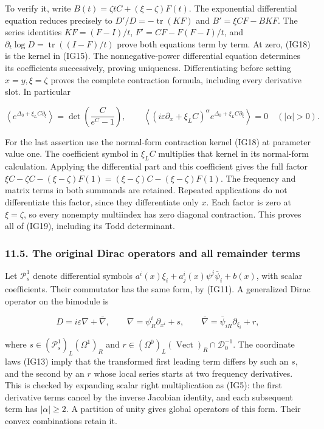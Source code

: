 \documentclass[
  11pt,
]{article}
\newcounter{none} %
\begin{document}
To verify it, write \(B(t)=\zeta tC+(\xi-\zeta)F(t)\). The exponential
differential equation reduces precisely to
\(D'/D=-\operatorname{tr}(K F)\) and \(B'=\xi C F-BKF\). The series
identities \(KF=(F-I)/t\), \(F'=CF-F(F-I)/t\), and
\(\partial_t\log D=\operatorname{tr}((I-F)/t)\) prove both equations
term by term. At zero, (IG18) is the kernel in (IG15). The
nonnegative-power differential equation determines its coefficients
successively, proving uniqueness. Differentiating before setting
\(x=y,\xi=\zeta\) proves the complete contraction formula, including
every derivative slot. In particular

\[
 \left\langle e^{\Delta_0+\xi_L C\partial_\xi}\right\rangle
 =\det\!\left(\frac{C}{e^C-1}\right),\qquad
 \left\langle(i\varepsilon\partial_x+\xi_L C)^\alpha
          e^{\Delta_0+\xi_L C\partial_\xi}\right\rangle=0
               \quad(|\alpha|>0).
\tag{IG19}
\]

For the last assertion use the normal-form contraction kernel (IG18) at
parameter value one. The coefficient symbol in \(\xi_L C\) multiplies
that kernel in its normal-form calculation. Applying the differential
part and this coefficient gives the full factor
\(\xi C-\zeta C-(\xi-\zeta)F(1)=(\xi-\zeta)C-(\xi-\zeta)F(1)\). The
frequency and matrix terms in both summands are retained. Repeated
applications do not differentiate this factor, since they differentiate
only \(x\). Each factor is zero at \(\xi=\zeta\), so every nonempty
multiindex has zero diagonal contraction. This proves all of (IG19),
including its Todd determinant.

\subsubsection{11.5. The original Dirac operators and all remainder
terms}\label{the-original-dirac-operators-and-all-remainder-terms}

Let \(\mathcal P^1_s\) denote differential symbols
\(a^i(x)\xi_i+a^i_j(x)\psi^j\bar\psi_i+b(x)\), with scalar coefficients.
Their commutator has the same form, by (IG11). A generalized Dirac
operator on the bimodule is

\[
 D=i\varepsilon\nabla+\bar\nabla,
 \qquad
 \nabla=\psi_R^i\partial_{x^i}+s,
 \qquad\bar\nabla=\bar\psi_{iR}\partial_{\xi_i}+r,
 \tag{IG20}
\]

where \(s\in(\mathcal P_s^1)_L(\Omega^1)_R\) and
\(r\in(\Omega^0)_L(\operatorname{Vect})_R\cap\mathcal D^{-1}_0\). The
coordinate laws (IG13) imply that the transformed first leading term
differs by such an \(s\), and the second by an \(r\) whose local series
starts at two frequency derivatives. This is checked by expanding scalar
right multiplication as (IG5): the first derivative terms cancel by the
inverse Jacobian identity, and each subsequent term has
\(|\alpha|\geq2\). A partition of unity gives global operators of this
form. Their convex combinations retain it.
\end{document}

